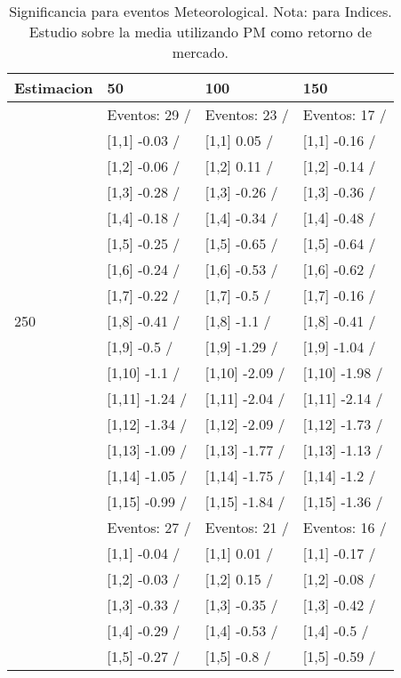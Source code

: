 \begin{table}

\caption{Significancia para eventos Meteorological. Nota: para Indices. Estudio sobre la media utilizando PM como retorno de mercado.}
\centering
\begin{tabular}[t]{llll}
\toprule
Estimacion & 50 & 100 & 150\\
\midrule
 & Eventos:  29 / & Eventos:  23 / & Eventos:  17 /\\
 & {}[1,1] -0.03  / & {}[1,1] 0.05  / & {}[1,1] -0.16  /\\
 & {}[1,2] -0.06  / & {}[1,2] 0.11  / & {}[1,2] -0.14  /\\
 & {}[1,3] -0.28  / & {}[1,3] -0.26  / & {}[1,3] -0.36  /\\
 & {}[1,4] -0.18  / & {}[1,4] -0.34  / & {}[1,4] -0.48  /\\
\addlinespace
 & {}[1,5] -0.25  / & {}[1,5] -0.65  / & {}[1,5] -0.64  /\\
 & {}[1,6] -0.24  / & {}[1,6] -0.53  / & {}[1,6] -0.62  /\\
 & {}[1,7] -0.22  / & {}[1,7] -0.5  / & {}[1,7] -0.16  /\\
250 & {}[1,8] -0.41  / & {}[1,8] -1.1  / & {}[1,8] -0.41  /\\
 & {}[1,9] -0.5  / & {}[1,9] -1.29  / & {}[1,9] -1.04  /\\
\addlinespace
 & {}[1,10] -1.1  / & {}[1,10] -2.09  / & {}[1,10] -1.98  /\\
 & {}[1,11] -1.24  / & {}[1,11] -2.04  / & {}[1,11] -2.14  /\\
 & {}[1,12] -1.34  / & {}[1,12] -2.09  / & {}[1,12] -1.73  /\\
 & {}[1,13] -1.09  / & {}[1,13] -1.77  / & {}[1,13] -1.13  /\\
 & {}[1,14] -1.05  / & {}[1,14] -1.75  / & {}[1,14] -1.2  /\\
\addlinespace
 & {}[1,15] -0.99  / & {}[1,15] -1.84  / & {}[1,15] -1.36  /\\
 & Eventos:  27 / & Eventos:  21 / & Eventos:  16 /\\
 & {}[1,1] -0.04  / & {}[1,1] 0.01  / & {}[1,1] -0.17  /\\
 & {}[1,2] -0.03  / & {}[1,2] 0.15  / & {}[1,2] -0.08  /\\
 & {}[1,3] -0.33  / & {}[1,3] -0.35  / & {}[1,3] -0.42  /\\
\addlinespace
 & {}[1,4] -0.29  / & {}[1,4] -0.53  / & {}[1,4] -0.5  /\\
 & {}[1,5] -0.27  / & {}[1,5] -0.8  / & {}[1,5] -0.59  /\\

\end{tabular}
\end{table}

